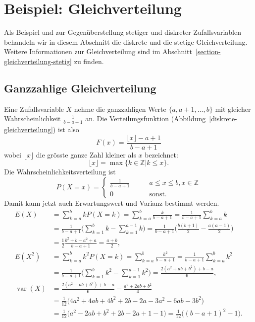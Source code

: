 \section{Beispiel: Gleichverteilung}
Als Beispiel und zur Gegenüberstellung stetiger und diskreter Zufallsvariablen
behandeln wir in diesem Abschnitt die diskrete und die stetige
Gleichverteilung.
Weitere Informationen zur Gleichverteilung sind
im Abschnitt~\ref{section-gleichverteilung-stetig} zu finden.

\subsection{Ganzzahlige Gleichverteilung}
Eine Zufallsvariable $X$ nehme die ganzzahligen Werte $\{a,a+1,\dots,b\}$ mit 
gleicher Wahrscheinlichkeit $\frac1{b-a+1}$ an.
Die Verteilungsfunktion
(Abbildung~\ref{diskrete-gleichverteilung})
ist also
\[
F(x)=
\frac{\lfloor x \rfloor -a+1}{b-a+1}
\]
wobei $\lfloor x \rfloor$ die grösste ganze Zahl kleiner als $x$
bezeichnet:
\[
\lfloor x\rfloor = \max\{k\in\mathbb Z|k\le x\}.
\]
Die Wahrscheinlichkeitsverteilung ist
\[
P(X=x)=\begin{cases}
\displaystyle \frac1{b-a+1}&\qquad a\le x\le b,x\in\mathbb Z\\
0&\qquad\text{sonst}.
\end{cases}
\]
Damit kann jetzt auch Erwartungswert und Varianz bestimmt werden.
{\allowdisplaybreaks
\begin{align*}
E(X)
&=
\sum_{k=a}^b kP(X=k)
=
\sum_{k=a}^b \frac{k}{b-a+1}
=
\frac1{b-a+1}\sum_{k=a}^bk
\\
&=
\frac1{b-a+1}\biggl(
\sum_{k=1}^bk-\sum_{k=1}^{a-1}k
\biggr)
=
\frac1{b-a+1}\biggl(
\frac{b(b+1)}2-\frac{a(a-1)}2
\biggr)
\\
&=
\frac12\frac{b^2+b-a^2+a}{b-a+1}=\frac{a+b}2,
\\
E(X^2)
&=
\sum_{k=a}^b k^2P(X=k)
=
\sum_{k=a}^b \frac{k^2}{b-a+1}
=
\frac1{b-a+1}\sum_{k=a}^bk^2
\\
&=
\frac1{b-a+1}\biggl(
\sum_{k=1}^bk^2-\sum_{k=1}^{a-1}k^2
\biggr)
=
\frac{ 2(a^2+ab+b^2)+b-a}{6},
\\
\operatorname{var}(X)
&=
\frac{ 2(a^2+ab+b^2)+b-a}{6}
-
\frac{a^2+2ab+b^2}{4}
\\
&=
\frac1{12}\bigl(
4a^2+4ab+4b^2+2b-2a-3a^2-6ab-3b^2
\bigr)
\\
&=
\frac1{12}\bigl(
a^2-2ab+b^2+2b-2a+1-1
\bigr)
=
\frac1{12}\bigl((b-a+1)^2 - 1\bigr).
\end{align*}
}
